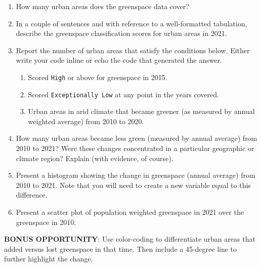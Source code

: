 \documentclass[
  12pt,
]{article}
\begin{document}
\begin{enumerate}
\def\labelenumi{\arabic{enumi}.}
\setcounter{enumi}{2}
\item
  How many urban areas does the greenspace data cover?
\item
  In a couple of sentences and with reference to a well-formatted
  tabulation, describe the greenspace classification scores for urban
  areas in 2021.
\item
  Report the number of urban areas that satisfy the conditions below.
  Either write your code inline or echo the code that generated the
  answer.

  \begin{enumerate}
  \def\labelenumii{\alph{enumii}.}
  \item
    Scored \texttt{High} or above for greenspace in 2015.
  \item
    Scored \texttt{Exceptionally\ Low} at any point in the years
    covered.
  \item
    Urban areas in arid climate that became greener (as measured by
    annual weighted average) from 2010 to 2020.
  \end{enumerate}
\item
  How many urban areas became less green (measured by annual average)
  from 2010 to 2021? Were these changes concentrated in a particular
  geographic or climate region? Explain (with evidence, of course).
\item
  Present a histogram showing the change in greenspace (annual average)
  from 2010 to 2021. Note that you will need to create a new variable
  equal to this difference.
\item
  Present a scatter plot of population weighted greenspace in 2021 over
  the greenspace in 2010.
\end{enumerate}

\textbf{BONUS OPPORTUNITY}: Use color-coding to differentiate urban
areas that added versus lost greenspace in that time. Then include a
45-degree line to further highlight the change.
\end{document}
